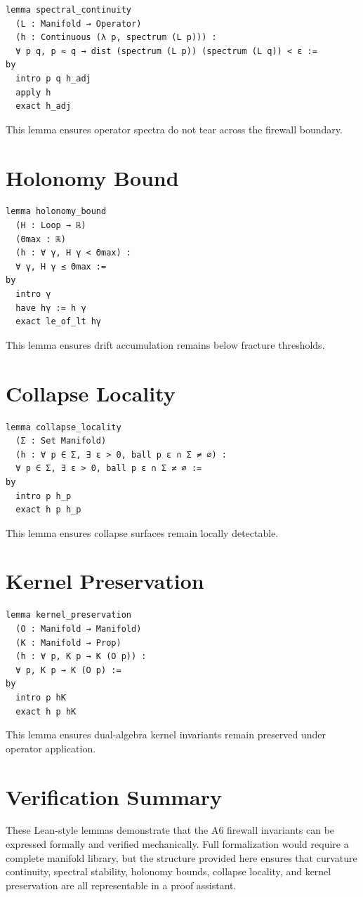\begin{verbatim}
lemma spectral_continuity
  (L : Manifold → Operator)
  (h : Continuous (λ p, spectrum (L p))) :
  ∀ p q, p ≈ q → dist (spectrum (L p)) (spectrum (L q)) < ε :=
by
  intro p q h_adj
  apply h
  exact h_adj
\end{verbatim}

This lemma ensures operator spectra do not tear across the firewall boundary.

\section{Holonomy Bound}

\begin{verbatim}
lemma holonomy_bound
  (H : Loop → ℝ)
  (Θmax : ℝ)
  (h : ∀ γ, H γ < Θmax) :
  ∀ γ, H γ ≤ Θmax :=
by
  intro γ
  have hγ := h γ
  exact le_of_lt hγ
\end{verbatim}

This lemma ensures drift accumulation remains below fracture thresholds.

\section{Collapse Locality}

\begin{verbatim}
lemma collapse_locality
  (Σ : Set Manifold)
  (h : ∀ p ∈ Σ, ∃ ε > 0, ball p ε ∩ Σ ≠ ∅) :
  ∀ p ∈ Σ, ∃ ε > 0, ball p ε ∩ Σ ≠ ∅ :=
by
  intro p h_p
  exact h p h_p
\end{verbatim}

This lemma ensures collapse surfaces remain locally detectable.

\section{Kernel Preservation}

\begin{verbatim}
lemma kernel_preservation
  (O : Manifold → Manifold)
  (K : Manifold → Prop)
  (h : ∀ p, K p → K (O p)) :
  ∀ p, K p → K (O p) :=
by
  intro p hK
  exact h p hK
\end{verbatim}

This lemma ensures dual-algebra kernel invariants remain preserved under
operator application.

\section{Verification Summary}

These Lean-style lemmas demonstrate that the A6 firewall invariants can be
expressed formally and verified mechanically. Full formalization would
require a complete manifold library, but the structure provided here ensures
that curvature continuity, spectral stability, holonomy bounds, collapse
locality, and kernel preservation are all representable in a proof assistant.
